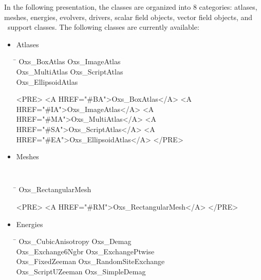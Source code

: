 In the following presentation, the  classes are organized
into 8 categories: atlases, meshes, energies, evolvers, drivers, scalar
field objects, vector field objects, and \MIF\ support classes.  The
following  classes are currently available:
\begin{itemize}
\newlength{\tabcolwidth}
\settowidth{\tabcolwidth}{\tt Oxs\_AffineTransformVectorField}
\addtolength{\tabcolwidth}{3em}
\setlength{\parskip}{0pt}
\setlength{\topsep}{0pt}
\item Atlases
   {\tt\begin{tabbing}
   \hspace*{\tabcolwidth}\=\kill
      Oxs\_BoxAtlas    \>  Oxs\_ImageAtlas \\
      Oxs\_MultiAtlas  \>  Oxs\_ScriptAtlas \\
      Oxs\_EllipsoidAtlas
   \end{tabbing}}
  \begin{rawhtml}
<PRE>
   <A HREF="#BA">Oxs_BoxAtlas</A>                    <A HREF="#IA">Oxs_ImageAtlas</A>
   <A HREF="#MA">Oxs_MultiAtlas</A>                  <A HREF="#SA">Oxs_ScriptAtlas</A>
   <A HREF="#EA">Oxs_EllipsoidAtlas</A>
</PRE>
  \end{rawhtml}
\item Meshes
  {\samepage\tt
   \begin{tabbing}
   \hspace*{\tabcolwidth}\=\kill
      Oxs\_RectangularMesh
   \end{tabbing}}
  \begin{rawhtml}
<PRE>
   <A HREF="#RM">Oxs_RectangularMesh</A>
</PRE>
  \end{rawhtml}
\item Energies
   {\tt\begin{tabbing}
   \hspace*{\tabcolwidth}\=\kill
      Oxs\_CubicAnisotropy     \>    Oxs\_Demag              \\
      Oxs\_Exchange6Ngbr       \>    Oxs\_ExchangePtwise     \\
      Oxs\_FixedZeeman         \>    Oxs\_RandomSiteExchange \\
      Oxs\_ScriptUZeeman       \>    Oxs\_SimpleDemag        \\

\end{tabbing}}
\end{itemize}
